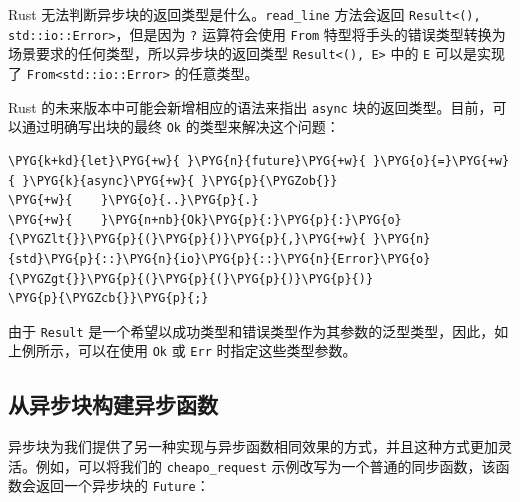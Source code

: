 Rust 无法判断异步块的返回类型是什么。\texttt{read\_line} 方法会返回 \texttt{Result<(), std::io::Error>}，但是因为 \texttt{?} 运算符会使用 \texttt{From} 特型将手头的错误类型转换为场景要求的任何类型，所以异步块的返回类型 \texttt{Result<(), E>} 中的 \texttt{E} 可以是实现了 \texttt{From<std::io::Error>} 的任意类型。

Rust 的未来版本中可能会新增相应的语法来指出 \texttt{async} 块的返回类型。目前，可以通过明确写出块的最终 \texttt{Ok} 的类型来解决这个问题：

\begin{Verbatim}[commandchars=\\\{\},breaklines=true,breakanywhere=true,fontsize=\codefont,xleftmargin=17bp]
\PYG{k+kd}{let}\PYG{+w}{ }\PYG{n}{future}\PYG{+w}{ }\PYG{o}{=}\PYG{+w}{ }\PYG{k}{async}\PYG{+w}{ }\PYG{p}{\PYGZob{}}
\PYG{+w}{    }\PYG{o}{..}\PYG{p}{.}
\PYG{+w}{    }\PYG{n+nb}{Ok}\PYG{p}{:}\PYG{p}{:}\PYG{o}{\PYGZlt{}}\PYG{p}{(}\PYG{p}{)}\PYG{p}{,}\PYG{+w}{ }\PYG{n}{std}\PYG{p}{::}\PYG{n}{io}\PYG{p}{::}\PYG{n}{Error}\PYG{o}{\PYGZgt{}}\PYG{p}{(}\PYG{p}{(}\PYG{p}{)}\PYG{p}{)}
\PYG{p}{\PYGZcb{}}\PYG{p}{;}
\end{Verbatim}

由于 \texttt{Result} 是一个希望以成功类型和错误类型作为其参数的泛型类型，因此，如上例所示，可以在使用 \texttt{Ok} 或 \texttt{Err} 时指定这些类型参数。

\subsection{从异步块构建异步函数}

异步块为我们提供了另一种实现与异步函数相同效果的方式，并且这种方式更加灵活。例如，可以将我们的 \texttt{cheapo\_request} 示例改写为一个普通的同步函数，该函数会返回一个异步块的 \texttt{Future}：

